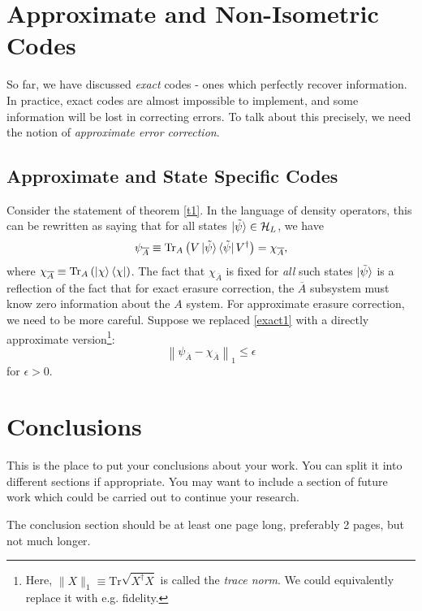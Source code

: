 \documentclass[12pt,a4paper]{report}
\numberwithin{equation}{section}
\newcommand{\ketbra}[2]{\ket{#1}\bra{#2}}
\newcommand{\ketbras}[1]{\ketbra{#1}{#1}}
\newcommand{\ol}[1]{\overline{#1}}
\newcommand{\tr}{\text{Tr}}
\theoremstyle{definition}
\theoremstyle{theorem}
\theoremstyle{theorem}
\theoremstyle{example}
\theoremstyle{definition}
\begin{document}
\chapter{Approximate and Non-Isometric Codes}
So far, we have discussed \textit{exact} codes - ones which perfectly recover information. In practice, exact codes are almost impossible to implement, and some information will be lost in correcting errors. To talk about this precisely, we need the notion of \textit{approximate error correction}.


\section{Approximate and State Specific Codes}
Consider the statement of theorem \ref{t1}. In the language of density operators, this can be rewritten as saying that for all states $\ket{\tilde{\psi}}\in\mathcal{H}_{L}$, we have
\begin{equation}\label{exact1}
	\psi_{\ol{A}}\equiv\tr_{A}\left(V\ketbras{\tilde{\psi}}V^{\dagger}\right)=\chi_{\ol{A}},
\end{equation}
where $\chi_{\ol{A}}\equiv\tr_{A}\left(\ketbras{\chi}\right)$. The fact that $\chi_{\ol{A}}$ is fixed for \textit{all} such states $\ket{\tilde{\psi}}$ is a reflection of the fact that for exact erasure correction, the $\ol{A}$ subsystem must know zero information about the $A$ system. For approximate erasure correction, we need to be more careful. Suppose we replaced \ref{exact1} with a directly approximate version\footnote{Here, $\lVert X\rVert_{1}\equiv \tr\sqrt{X^{\dagger}X}$ is called the \textit{trace norm}. We could equivalently replace it with e.g. fidelity.}:
\begin{equation}
	\left\lVert \psi_{\ol{A}}-\chi_{\ol{A}}\right\rVert_{1}\leq \epsilon
\end{equation}
for $\epsilon>0$. 

\chapter{Conclusions}

This is the place to put your conclusions about your work. You can
split it into different sections if appropriate. You may want to include
a section of future work which could be carried out to continue your
research.

The conclusion section should be at least one page long, preferably 2
pages, but not much longer.

\appendix
\end{document}
